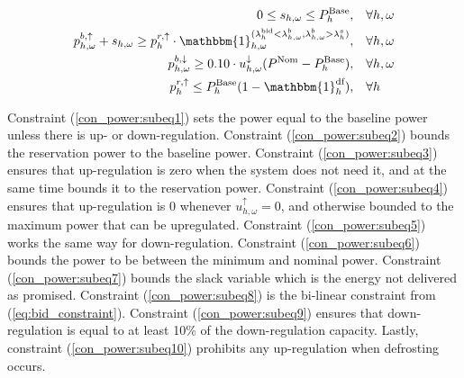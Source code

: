 {\begin{subequations}
\begin{align}
        0 \leq s_{h,\omega} \leq P^{\text{Base}}_{h}, \quad                                                                                                                                                   & \forall{h,\omega}                                                                             \label{con_power:subeq7}  \\
        p^{b, \uparrow}_{h,\omega} + s_{h,\omega} \geq p^{r,\uparrow}_{h} \cdot \mathbbm{1}_{h,\omega}^{(\lambda^{\text{bid}}_{h} < \lambda^{b}_{h,\omega}, \lambda^{b}_{h,\omega} > \lambda^{s}_{h})}, \quad & \forall{h,\omega} \label{con_power:subeq8}                                                                              \\
        p^{b, \downarrow}_{h,\omega} \geq 0.10 \cdot u^{\downarrow}_{h,\omega} (P^{\text{Nom}} - P^{\text{Base}}_{h}), \quad                                                                                  & \forall{h,\omega}                                                                             \label{con_power:subeq9}  \\
        p^{r, \uparrow}_{h} \leq P^{\text{Base}}_{h} (1 - \mathbbm{1}_{h}^{\text{df}}), \quad                                                                                                                 & \forall{h} \label{con_power:subeq10}
    \end{align}
\end{subequations}

Constraint (\ref{con_power:subeq1}) sets the power equal to the baseline power unless there is up- or down-regulation. Constraint (\ref{con_power:subeq2}) bounds the reservation power to the baseline power. Constraint (\ref{con_power:subeq3}) ensures that up-regulation is zero when the system does not need it, and at the same time bounds it to the reservation power. Constraint (\ref{con_power:subeq4}) ensures that up-regulation is 0 whenever $u^{\uparrow}_{h,\omega} = 0$, and otherwise bounded to the maximum power that can be upregulated. Constraint (\ref{con_power:subeq5}) works the same way for down-regulation. Constraint (\ref{con_power:subeq6}) bounds the power to be between the minimum and nominal power. Constraint (\ref{con_power:subeq7}) bounds the slack variable which is the energy not delivered as promised. Constraint (\ref{con_power:subeq8}) is the bi-linear constraint from (\ref{eq:bid_constraint}). Constraint (\ref{con_power:subeq9}) ensures that down-regulation is equal to at least 10\% of the down-regulation capacity. Lastly, constraint (\ref{con_power:subeq10}) prohibits any up-regulation when defrosting occurs.

}
